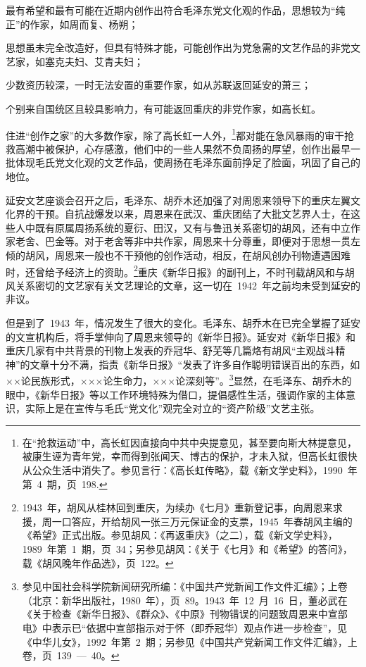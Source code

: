 最有希望和最有可能在近期内创作出符合毛泽东党文化观的作品，思想较为“纯正”的作家，如周而复、杨朔；

思想虽未完全改造好，但具有特殊才能，可能创作出为党急需的文艺作品的非党文艺家，如塞克夫妇、艾青夫妇；

少数资历较深，一时无法安置的重要作家，如从苏联返回延安的萧三；

个别来自国统区且较具影响力，有可能返回重庆的非党作家，如高长虹。

住进“创作之家”的大多数作家，除了高长虹一人外，\footnote{在“抢救运动”中，高长虹因直接向中共中央提意见，甚至要向斯大林提意见，被康生诬为青年党，幸而得到张闻天、博古的保护，才未入狱，但高长虹很快从公众生活中消失了。参见言行：《高长虹传略》，载《新文学史料》，1990~年第~4~期，页~198.}都对能在急风暴雨的审干抢救高潮中被保护，心存感激，他们中的一些人果然不负周扬的厚望，创作出最早一批体现毛氏党文化观的文艺作品，使周扬在毛泽东面前挣足了脸面，巩固了自己的地位。

延安文艺座谈会召开之后，毛泽东、胡乔木还加强了对周恩来领导下的重庆左翼文化界的干预。自抗战爆发以来，周恩来在武汉、重庆团结了大批文艺界人士，在这些人中既有原属周扬系统的夏衍、田汉，又有与鲁迅关系密切的胡风，还有中立作家老舍、巴金等。对于老舍等非中共作家，周恩来十分尊重，即便对于思想一贯左倾的胡风，周恩来一般也不干预他的创作活动，相反，在胡风创办刊物遭遇困难时，还曾给予经济上的资助。\footnote{1943~年，胡风从桂林回到重庆，为续办《七月》重新登记事，向周恩来求援，周一口答应，开给胡风一张三万元保证金的支票，1945~年春胡风主编的《希望》正式出版。参见胡风：《再返重庆》（之二），载《新文学史料》，1989~年第~1~期，页~34；另参见胡风：《关于《七月》和《希望》的答问》，载《胡风晚年作品选》，页~122。}重庆《新华日报》的副刊上，不时刊载胡风和与胡风关系密切的文艺家有关文艺理论的文章，这一切在~1942~年之前均未受到延安的非议。

但是到了~1943~年，情况发生了很大的变化。毛泽东、胡乔木在已完全掌握了延安的文宣机构后，将手掌伸向了周恩来领导的《新华日报》。延安对《新华日报》和重庆几家有中共背景的刊物上发表的乔冠华、舒芜等几篇烙有胡风“主观战斗精神”的文章十分不满，指责《新华日报》“发表了许多自作聪明错误百出的东西，如××论民族形式，×××论生命力，×××论深刻等”。\footnote{参见中国社会科学院新闻研究所编：《中国共产党新闻工作文件汇编》；上卷（北京：新华出版社，1980~年），页~89。1943~年~12~月~16~日，董必武在《关于检查《新华日报》、《群众》、《中原》刊物错误的问题致周恩来中宣部电》中表示已“依据中宣部指示对于怀（即乔冠华）观点作进一步检查”，见《中华儿女》，1992~年第~2~期；另参见《中国共产党新闻工作文件汇编》，上卷，页~139~—~40。}显然，在毛泽东、胡乔木的眼中，《新华日报》等以工作环境特殊为借口，提倡感性生活，强调作家的主体意识，实际上是在宣传与毛氏“党文化”观完全对立的“资产阶级”文艺主张。

